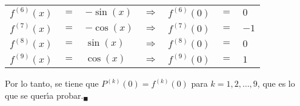 \begin{solucion}
\begin{center}
\begin{tabular}{rclcrcl}
   $f^{(6)}(x)$ & $=$ & $-\sin(x)$ & $\Rightarrow$ & $f^{(6)}(0)$ & $=$ & $0$ \\
   $f^{(7)}(x)$ & $=$ & $-\cos(x)$ & $\Rightarrow$ & $f^{(7)}(0)$ & $=$ & $-1$ \\
   $f^{(8)}(x)$ & $=$ & $\sin(x)$ & $\Rightarrow$ & $f^{(8)}(0)$ & $=$ & $0$ \\
   $f^{(9)}(x)$ & $=$ & $\cos(x)$ & \hspace{1cm} $\Rightarrow$ \hspace{1cm} & $f^{(9)}(0)$ & $=$ & $1$
  \end{tabular}
 \end{center}
 Por lo tanto, se tiene que $P^{(k)}(0) = f^{(k)}(0)$ para $k=1,2,\ldots, 9$, que es lo que se quer\'{\i}a probar.${}_{\blacksquare}$
\end{solucion}
